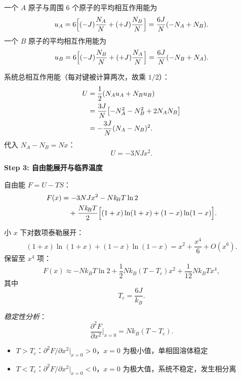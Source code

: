 \begin{derivationbox}[标准解题过程]
一个 $A$ 原子与周围 $6$ 个原子的平均相互作用能为
\begin{equation}
u_A = 6\Bigl[(-J)\frac{N_A}{N} + (+J)\frac{N_B}{N}\Bigr] = \frac{6J}{N}(-N_A+N_B).
\end{equation}
一个 $B$ 原子的平均相互作用能为
\begin{equation}
u_B = 6\Bigl[(-J)\frac{N_B}{N} + (+J)\frac{N_A}{N}\Bigr] = \frac{6J}{N}(-N_B+N_A).
\end{equation}

系统总相互作用能（每对键被计算两次，故乘 $1/2$）：
\begin{align}
U &= \frac{1}{2}(N_A u_A + N_B u_B) \notag\\
  &= \frac{3J}{N}\bigl[-N_A^2 - N_B^2 + 2N_A N_B\bigr] \notag\\
  &= -\frac{3J}{N}(N_A-N_B)^2.
\end{align}
代入 $N_A-N_B=Nx$：
\begin{equation}
\boxed{U = -3NJx^2.}
\end{equation}

\textbf{Step 3: 自由能展开与临界温度}

自由能 $F=U-TS$：
\begin{align}
F(x) &= -3NJx^2 - Nk_{\!B}T\ln 2 \notag\\
     &\quad + \frac{Nk_{\!B}T}{2}\Bigl[(1+x)\ln(1+x) + (1-x)\ln(1-x)\Bigr].
\end{align}

小 $x$ 下对数项泰勒展开：
\begin{equation}
(1+x)\ln(1+x) + (1-x)\ln(1-x) = x^2 + \frac{x^4}{6} + O(x^6).
\end{equation}
保留至 $x^4$ 项：
\begin{equation}
F(x) \approx -Nk_{\!B}T\ln 2 + \frac{1}{2}Nk_{\!B}(T-T_c)x^2 + \frac{1}{12}Nk_{\!B}Tx^4,
\end{equation}
其中
\begin{equation}
\boxed{T_c = \frac{6J}{k_{\!B}}.}
\end{equation}

\textit{稳定性分析}：
\begin{equation}
\frac{\partial^2 F}{\partial x^2}\bigg|_{x=0} = Nk_{\!B}(T-T_c).
\end{equation}
\begin{itemize}
    \item $T>T_c$：$\partial^2 F/\partial x^2|_{x=0}>0$，$x=0$ 为极小值，单相固溶体稳定
    \item $T<T_c$：$\partial^2 F/\partial x^2|_{x=0}<0$，$x=0$ 为极大值，系统不稳定，发生相分离
\end{itemize}


\end{derivationbox}
